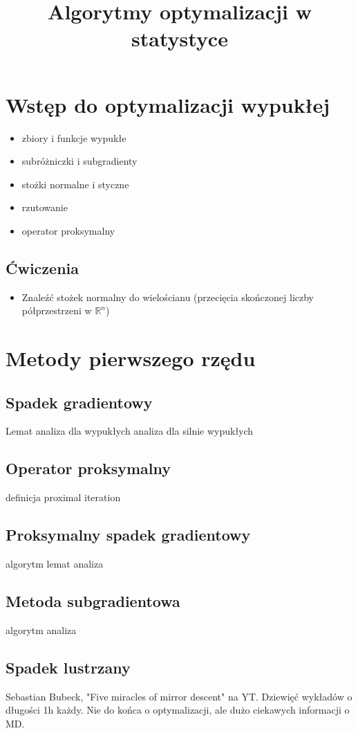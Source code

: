 \documentclass[10pt,a4paper,draft]{report}
\title{Algorytmy optymalizacji w statystyce}
\begin{document}
\chapter{Wstęp do optymalizacji wypukłej}
\begin{itemize}
\item zbiory i funkcje wypukłe
\item subróżniczki i subgradienty
\item stożki normalne i styczne
\item rzutowanie
\item operator proksymalny
\end{itemize} 

\section{Ćwiczenia}
\begin{itemize}
\item Znaleźć stożek normalny do wielościanu (przecięcia skończonej liczby półprzestrzeni w $\mathbb{R}^n$)
\end{itemize}

\chapter{Metody pierwszego rzędu}
\section{Spadek gradientowy}
Lemat
analiza dla wypukłych
analiza dla silnie wypukłych
\section{Operator proksymalny}
definicja
proximal iteration

\section{Proksymalny spadek gradientowy}
algorytm
lemat
analiza
\section{Metoda subgradientowa}
algorytm
analiza

\section{Spadek lustrzany}

Sebastian Bubeck, "Five miracles of mirror descent" na YT. Dziewięć wykładów o długości 1h każdy. Nie do końca o optymalizacji, ale dużo ciekawych informacji o MD.
\end{document}
